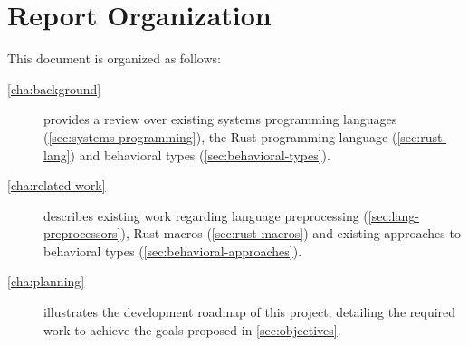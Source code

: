 \section{Report Organization}\label{sec:organization}

This document is organized as follows:

\begin{description}
    \item [\autoref{cha:background}] provides a review over
          existing systems programming languages (\autoref{sec:systems-programming}),
          the Rust programming language (\autoref{sec:rust-lang}) and
          behavioral types (\autoref{sec:behavioral-types}).
    \item [\autoref{cha:related-work}] describes existing work regarding
          language preprocessing (\autoref{sec:lang-preprocessors}),
          Rust macros (\autoref{sec:rust-macros}) and
          existing approaches to behavioral types (\autoref{sec:behavioral-approaches}).
    \item [\autoref{cha:planning}] illustrates the development roadmap of this project,
          detailing the required work to achieve the goals proposed in \autoref{sec:objectives}.
\end{description}